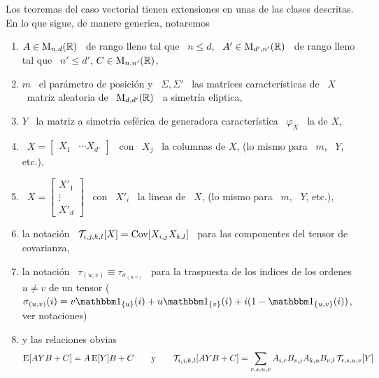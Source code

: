 Los  teoremas  del caso  vectorial  tienen extensiones  en  unas  de las  clases
descritas. En lo que sigue, de manere generica, notaremos
%
\begin{enumerate}[label = (N \arabic*)]
\item $A \in \mathrm{M}_{n,d}(\mathbb{R})$ \ de rango lleno  tal que \ $n \le d$, \ $A' \in
  \mathrm{M}_{d',n'}(\mathbb{R})$  \  de  rango  lleno  tal  que \  $n'  \le  d'$,  $C  \in
  \mathrm{M}_{n,n'}(\mathbb{R})$,
%
\item $m$  \ el par\'ametro de posici\'on  y \ $\Sigma, \Sigma'$  \ las matrices
  caracter\'isticas de  \ $X$ \ matriz  aleatoria de \  $\mathrm{M}_{d,d'}(\mathbb{R})$ \ a
  simetr\'ia el\'iptica,
%
\item $Y$ \  la matriz a simetr\'ia esf\'erica  de generadora caracter\'istica \
  $\varphi_X$ \ la de $X$,
%
\item \ $X = \begin{bmatrix} X_1 &  \cdots X_{d'} \end{bmatrix}$ \ con \ $X_j$ \
  la columnas de $X$, (lo mismo para \ $m$, \ $Y$, etc.),
%
\item \ $X = \begin{bmatrix} X'_1 \\ \vdots \\ X'_d \end{bmatrix}$ \ con \ $X'_i$ \
  la lineas de \ $X$, (lo mismo para \ $m$, \ $Y$, etc.),
%
\item  la notaci\'on \  $\mathcal{T}_{i,j,k,l}[X] =  \operatorname{Cov}[ X_{i,j}  X_{k,l}]$ \  para las
  componentes del tensor de covarianza,
%
\item  la notaci\'on  \ $\tau_{(u,v)}  \equiv \tau_{\sigma_{(u,v)}}$  \  para la
  traspuesta  de  los   indices  de  los  ordenes  $u  \ne   v$  de  un  tensor
  ($\sigma_{(u,v)}(i)   =   v   \un_{\{u\}}(i)    +   u   \un_{\{v\}}(i)   +   i
  (1-\un_{\{u,v\}}(i))$, ver notaciones)
%
\item\label{Enum:MP:RelacionesObvias} y las relaciones obvias
%
\[
\operatorname{E}[ A Y B + C] = A  \operatorname{E}[Y] B + C \qquad \mbox{y} \qquad \mathcal{T}_{i,j,k,l}[ A Y
B + C] = \sum_{r,s,u,v} A_{i,r} B_{s,j} A_{k,u} B_{v,l} \, \mathcal{T}_{r,s,u,v}[Y]
\]
\end{enumerate}
%
